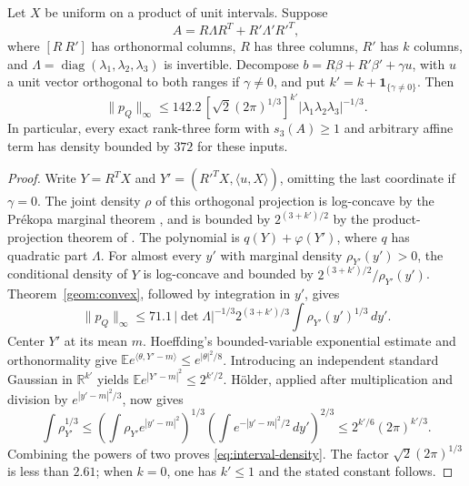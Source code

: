 \begin{theorem}\label{geom:interval}
Let $X$ be uniform on a product of unit intervals. Suppose
\[
 A=R\Lambda R^T+R'\Lambda'R'^T,
\]
where $[R\ R']$ has orthonormal columns, $R$ has three columns, $R'$ has $k$ columns, and $\Lambda=\operatorname{diag}(\lambda_1,\lambda_2,\lambda_3)$ is invertible. Decompose $b=R\beta+R'\beta'+\gamma u$, with $u$ a unit vector orthogonal to both ranges if $\gamma\ne0$, and put $k'=k+\mathbf1_{\{\gamma\ne0\}}$. Then
\begin{equation}\label{eq:interval-density}
 \|p_Q\|_\infty\le142.2\,[\sqrt2(2\pi)^{1/3}]^{k'}
 |\lambda_1\lambda_2\lambda_3|^{-1/3}.
\end{equation}
In particular, every exact rank-three form with $s_3(A)\ge1$ and arbitrary affine term has density bounded by $372$ for these inputs.
\end{theorem}
\begin{proof}
Write $Y=R^TX$ and $Y'=(R'^TX,\langle u,X\rangle)$, omitting the last coordinate if $\gamma=0$. The joint density $\rho$ of this orthogonal projection is log-concave by the Pr\'ekopa marginal theorem \citep{Prekopa1973}, and is bounded by $2^{(3+k')/2}$ by the product-projection theorem of \citet{LPP2016}. The polynomial is $q(Y)+\varphi(Y')$, where $q$ has quadratic part $\Lambda$. For almost every $y'$ with marginal density $\rho_{Y'}(y')>0$, the conditional density of $Y$ is log-concave and bounded by $2^{(3+k')/2}/\rho_{Y'}(y')$. Theorem~\ref{geom:convex}, followed by integration in $y'$, gives
\[
 \|p_Q\|_\infty\le71.1\,|\det\Lambda|^{-1/3}
 2^{(3+k')/3}\int\rho_{Y'}(y')^{1/3}\,dy'.
\]
Center $Y'$ at its mean $m$. Hoeffding's bounded-variable exponential estimate \citep{Hoeffding1963} and orthonormality give
$\mathbb E e^{\langle\theta,Y'-m\rangle}\le e^{|\theta|^2/8}$.
Introducing an independent standard Gaussian in $\mathbb R^{k'}$ yields
$\mathbb E e^{|Y'-m|^2}\le2^{k'/2}$.
H\"older, applied after multiplication and division by $e^{|y'-m|^2/3}$, now gives
\[
 \int\rho_{Y'}^{1/3}\le
 \left(\int\rho_{Y'}e^{|y'-m|^2}\right)^{1/3}
 \left(\int e^{-|y'-m|^2/2}\,dy'\right)^{2/3}
 \le2^{k'/6}(2\pi)^{k'/3}.
\]
Combining the powers of two proves \eqref{eq:interval-density}. The factor $\sqrt2(2\pi)^{1/3}$ is less than $2.61$; when $k=0$, one has $k'\le1$ and the stated constant follows.
\end{proof}

